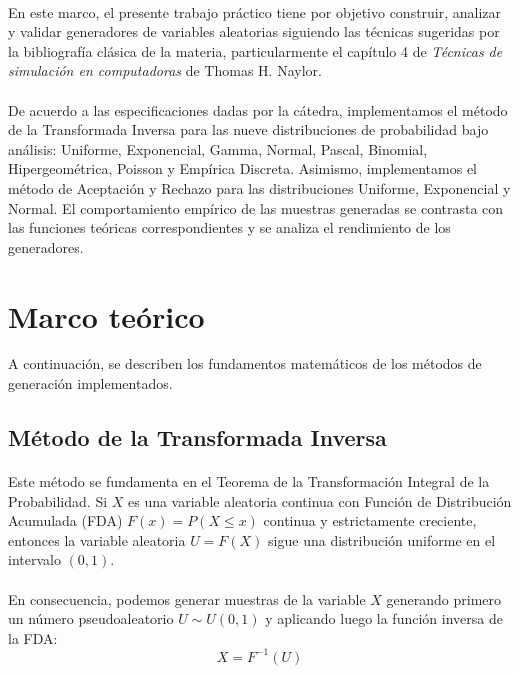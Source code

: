 \documentclass{article}
\begin{document}
\paragraph{}
En este marco, el presente trabajo práctico tiene por objetivo construir, analizar y validar generadores de variables aleatorias siguiendo las técnicas sugeridas por la bibliografía clásica de la materia, particularmente el capítulo 4 de \textit{Técnicas de simulación en computadoras} de Thomas H. Naylor. 

\paragraph{}
De acuerdo a las especificaciones dadas por la cátedra, implementamos el método de la Transformada Inversa para las nueve distribuciones de probabilidad bajo análisis: Uniforme, Exponencial, Gamma, Normal, Pascal, Binomial, Hipergeométrica, Poisson y Empírica Discreta. Asimismo, implementamos el método de Aceptación y Rechazo para las distribuciones Uniforme, Exponencial y Normal. El comportamiento empírico de las muestras generadas se contrasta con las funciones teóricas correspondientes y se analiza el rendimiento de los generadores.

\newpage
\section{Marco teórico}
\label{sec:headings}
A continuación, se describen los fundamentos matemáticos de los métodos de generación implementados.

\subsection{Método de la Transformada Inversa}
\paragraph{}
Este método se fundamenta en el Teorema de la Transformación Integral de la Probabilidad. Si $X$ es una variable aleatoria continua con Función de Distribución Acumulada (FDA) $F(x) = P(X \le x)$ continua y estrictamente creciente, entonces la variable aleatoria $U = F(X)$ sigue una distribución uniforme en el intervalo $(0,1)$.

\paragraph{}
En consecuencia, podemos generar muestras de la variable $X$ generando primero un número pseudoaleatorio $U \sim U(0,1)$ y aplicando luego la función inversa de la FDA:
\begin{equation}
X = F^{-1}(U)
\end{equation}
\end{document}
